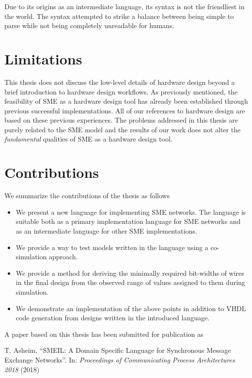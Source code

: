 Due to its origins as an intermediate language, its syntax is not the
friendliest in the world. The syntax attempted to strike a balance between being
simple to parse while not being completely unreadable for humans.

\section{Limitations}
This thesis does not discuss the low-level details of hardware design beyond a
brief introduction to hardware design workflows. As previously mentioned, the
feasibility of SME as a hardware design tool has already been established
through previous successful implementations. All of our references to hardware
design are based on these previous experiences. The problems addressed in this
thesis are purely related to the SME model and the results of our work does not
alter the {\itshape fundamental} qualities of SME as a hardware design tool.


\section{Contributions}
We summarize the contributions of the thesis as follows

\begin{itemize}
\item We present a new language for implementing SME networks. The language is
  suitable both as a primary implementation language for SME networks and as an
  intermediate language for other SME implementations.
\item We provide a way to test models written in the language using a
  co-simulation approach.
\item We provide a method for deriving the minimally required bit-widths of
  wires in the final design from the observed range of values assigned to them
  during simulation.
\item We demonstrate an implementation of the above points in addition to VHDL
  code generation from designs written in the introduced language.
\end{itemize}

\noindent A paper based on this thesis has been submitted for publication as

\begin{center}
\begin{minipage}{0.8\textwidth}
  T. Asheim, “SMEIL: A Domain Specific Language for Synchronous Message Exchange
  Networks”. In: {\itshape Proceedings of Communicating Process Architectures
    2018} (2018)
\end{minipage}
\end{center}

